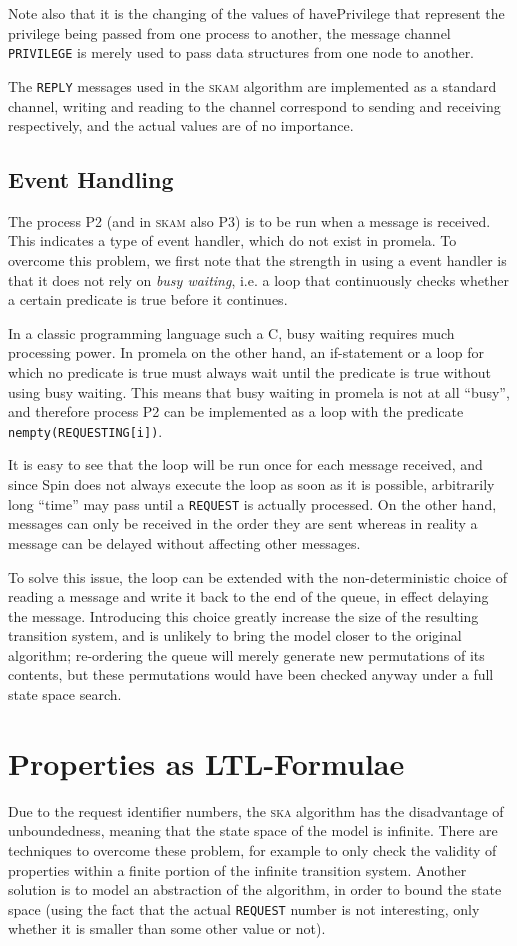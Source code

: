 \documentclass[a4paper,10pt]{llncs}
\begin{document}
Note also that it is the changing of the values of havePrivilege that represent the privilege being passed from one process to another, the message channel \texttt{PRIVILEGE} is merely used to pass data structures from one node to another.

The \texttt{REPLY} messages used in the \textsc{skam} algorithm are implemented as a standard channel, writing and reading to the channel correspond to sending and receiving respectively, and the actual values are of no importance.

\subsection{Event Handling}
The process P2 (and in \textsc{skam} also P3) is to be run when a message is received. This indicates a type of event handler, which do not exist in promela. To overcome this problem, we first note that the strength in using a event handler is that it does not rely on \emph{busy waiting}, i.e. a loop that continuously checks whether a certain predicate is true before it continues.

In a classic programming language such a C, busy waiting requires much processing power. In promela on the other hand, an if-statement or a loop for which no predicate is true must always wait until the predicate is true without using busy waiting. This means that busy waiting in promela is not at all ``busy'', and therefore  process P2 can be implemented as a loop with the predicate \texttt{nempty(REQUESTING[i])}.

It is easy to see that the loop will be run once for each message received, and since Spin does not always execute the loop as soon as it is possible, arbitrarily long ``time'' may pass until a \texttt{REQUEST} is actually processed. On the other hand, messages can only be received in the order they are sent whereas in reality a message can be delayed without affecting other messages. 

To solve this issue, the loop can be extended with the non-deterministic choice of reading a message and write it back to the end of the queue, in effect delaying the message. Introducing this choice greatly increase the size of the resulting transition system, and is unlikely to bring the model closer to the original algorithm; re-ordering the queue will merely generate new permutations of its contents, but these permutations would have been checked anyway under a full state space search.


\section{Properties as LTL-Formulae}
Due to the request identifier numbers, the \textsc{ska} algorithm has the disadvantage of unboundedness, meaning that the state space of the model is infinite. There are techniques to overcome these problem, for example to only check the validity of properties within a finite portion of the infinite transition system. Another solution is to model an abstraction of the algorithm, in order to bound the state space (using the fact that the actual \texttt{REQUEST} number is not interesting, only whether it is smaller than some other value or not).
\end{document}
